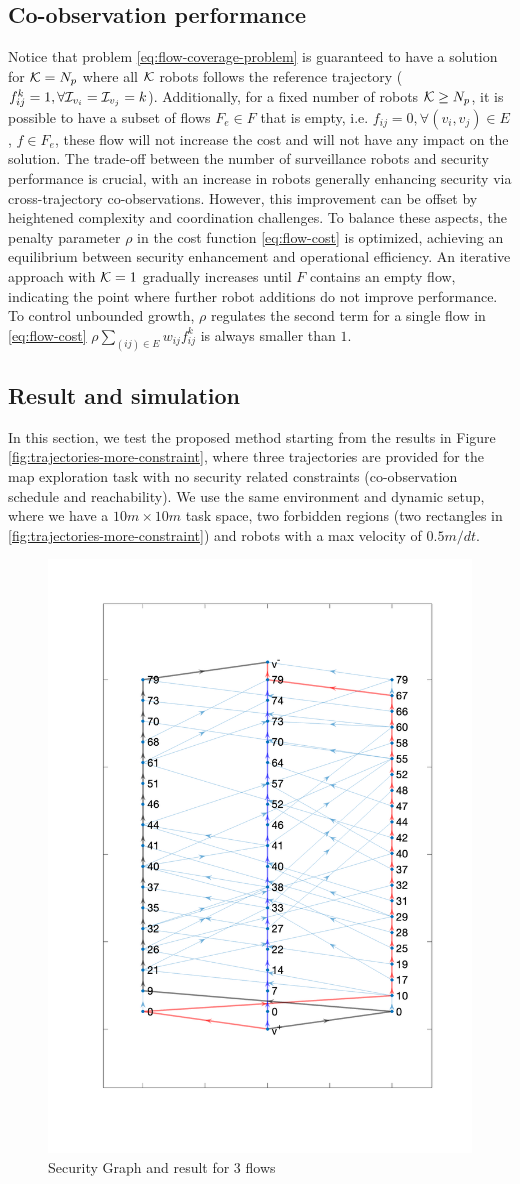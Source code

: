 \documentclass[journal]{IEEEtran}  %
\begin{document}
\subsection{Co-observation performance}
Notice that problem \eqref{eq:flow-coverage-problem} is guaranteed to have a solution for $\mathcal{K}=N_{p}$ where all $\mathcal{K}$ robots follows the reference trajectory ($f^{k}_{ij}=1, \forall \mathcal{I}_{v_{i}}=\mathcal{I}_{v_{j}}=k$).  Additionally, for a fixed number of robots $\mathcal{K} \geq N_{p}$, it is possible to have a subset of flows $F_{e} \in F$ that is empty, i.e. $f_{ij}=0, \forall (v_{i},v_{j})\in E$, $f\in F_{e}$, these flow will not increase the cost and will not have any impact on the solution.  
The trade-off between the number of surveillance robots and security performance is crucial, with an increase in robots generally enhancing security via cross-trajectory co-observations. However, this improvement can be offset by heightened complexity and coordination challenges. To balance these aspects, the penalty parameter $\rho$ in the cost function \ref{eq:flow-cost} is optimized, achieving an equilibrium between security enhancement and operational efficiency. An iterative approach with $\mathcal{K}=1$ gradually increases until $F$ contains an empty flow, indicating the point where further robot additions do not improve performance. To control unbounded growth, $\rho$ regulates the second term for a single flow in \eqref{eq:flow-cost} $ \rho \sum_{(ij)\in E} w_{ij} f^k_{ij}$ is always smaller than $1$.

\subsection{Result and simulation}
In this section, we test the proposed method starting from the results in Figure \ref{fig:trajectories-more-constraint}, where three trajectories are provided for the map exploration task with no security related constraints (co-observation schedule and reachability). We use the same environment and dynamic setup, where we have a $10m\times10m$ task space, two forbidden regions (two rectangles in  \ref{fig:trajectories-more-constraint}) and robots with a max velocity of $0.5m/dt$.

\begin{figure}[t]
\begin{center}
\includegraphics[width=0.4\linewidth]{graph_flow_result_3}
\caption{Security Graph and result for 3 flows}
\label{fig:security-graph-3-flow}
\end{center}
\end{figure}
\end{document}

